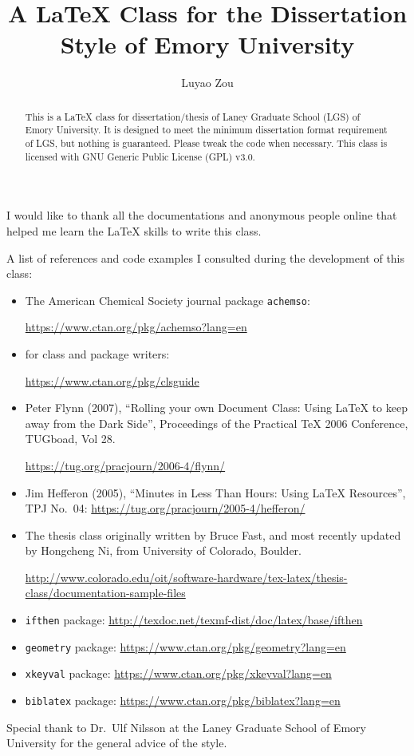 \documentclass[draft]{emory}
\title{A \LaTeX{} Class for the Dissertation Style of Emory University}
\author{Luyao Zou}                      %
\begin{document}
\begin{abstract}

This is a \LaTeX{} class for dissertation/thesis of Laney Graduate School (LGS) of Emory University.
It is designed to meet the minimum dissertation format
requirement of LGS, but nothing is guaranteed. Please tweak the
code when necessary. This class is licensed with GNU Generic Public License (GPL) v3.0.

\end{abstract}

\begin{acknowledgement}%

I would like to thank all the documentations and anonymous people online that
helped me learn the \LaTeX{} skills to write this class. 

A list of references and code examples I consulted during the development
of this class:
\begin{itemize}
  \item The American Chemical Society journal package \Verb|achemso|:
  
        \url{https://www.ctan.org/pkg/achemso?lang=en}
  \item \LaTeXe{} for class and package writers:
        
        \url{https://www.ctan.org/pkg/clsguide}
  \item Peter Flynn (2007), ``Rolling your own Document Class: Using \LaTeX{} to keep away from the Dark Side'', Proceedings of the Practical \TeX{} 2006 Conference, TUGboad, Vol 28.
        
        \url{https://tug.org/pracjourn/2006-4/flynn/}
  \item Jim Hefferon (2005), ``Minutes in Less Than Hours: Using \LaTeX{} Resources'', TPJ No.~04: 
        \url{https://tug.org/pracjourn/2005-4/hefferon/} 
  \item The thesis class originally written by Bruce Fast, and most recently updated by Hongcheng Ni, from University of Colorado, Boulder. 
        
        \url{http://www.colorado.edu/oit/software-hardware/tex-latex/thesis-class/documentation-sample-files}
  \item \Verb|ifthen| package: \url{http://texdoc.net/texmf-dist/doc/latex/base/ifthen}
  \item \Verb|geometry| package: \url{https://www.ctan.org/pkg/geometry?lang=en}
  \item \Verb|xkeyval| package: \url{https://www.ctan.org/pkg/xkeyval?lang=en}
  \item \Verb|biblatex| package: \url{https://www.ctan.org/pkg/biblatex?lang=en}
\end{itemize}

Special thank to Dr.~Ulf Nilsson at the Laney Graduate School of Emory University
for the general advice of the style.

\end{acknowledgement}
\end{document}
